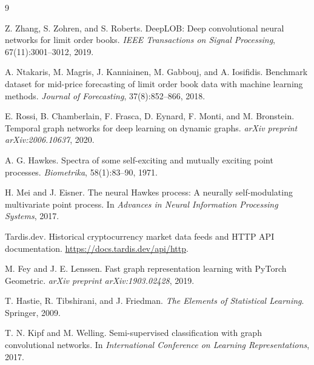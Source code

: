 \documentclass[11pt]{article}
\begin{document}
\begin{thebibliography}{9}

Z. Zhang, S. Zohren, and S. Roberts.
\newblock DeepLOB: Deep convolutional neural networks for limit order books.
\newblock \emph{IEEE Transactions on Signal Processing}, 67(11):3001--3012, 2019.

A. Ntakaris, M. Magris, J. Kanniainen, M. Gabbouj, and A. Iosifidis.
\newblock Benchmark dataset for mid-price forecasting of limit order book data with machine learning methods.
\newblock \emph{Journal of Forecasting}, 37(8):852--866, 2018.

E. Rossi, B. Chamberlain, F. Frasca, D. Eynard, F. Monti, and M. Bronstein.
\newblock Temporal graph networks for deep learning on dynamic graphs.
\newblock \emph{arXiv preprint arXiv:2006.10637}, 2020.

A. G. Hawkes.
\newblock Spectra of some self-exciting and mutually exciting point processes.
\newblock \emph{Biometrika}, 58(1):83--90, 1971.

H. Mei and J. Eisner.
\newblock The neural Hawkes process: A neurally self-modulating multivariate point process.
\newblock In \emph{Advances in Neural Information Processing Systems}, 2017.

Tardis.dev.
\newblock Historical cryptocurrency market data feeds and HTTP API documentation.
\newblock \url{https://docs.tardis.dev/api/http}.


M. Fey and J. E. Lenssen.
\newblock Fast graph representation learning with PyTorch Geometric.
\newblock \emph{arXiv preprint arXiv:1903.02428}, 2019.

T. Hastie, R. Tibshirani, and J. Friedman.
\newblock \emph{The Elements of Statistical Learning}.
\newblock Springer, 2009.

T. N. Kipf and M. Welling.
\newblock Semi-supervised classification with graph convolutional networks.
\newblock In \emph{International Conference on Learning Representations}, 2017.

\end{thebibliography}
\end{document}

